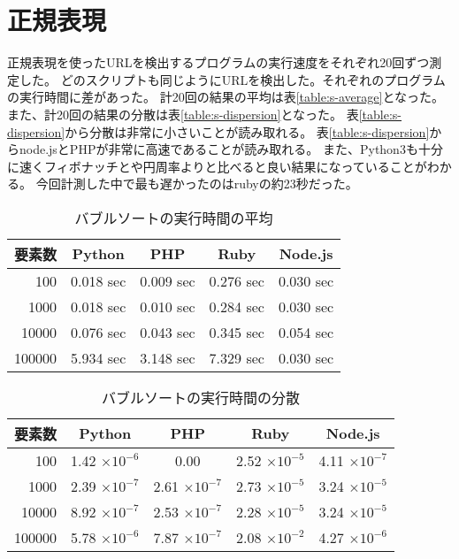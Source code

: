 \section{正規表現}
正規表現を使ったURLを検出するプログラムの実行速度をそれぞれ20回ずつ測定した。
どのスクリプトも同じようにURLを検出した。それぞれのプログラムの実行時間に差があった。
計20回の結果の平均は表\ref{table:s-average}となった。
また、計20回の結果の分散は表\ref{table:s-dispersion}となった。
表\ref{table:s-dispersion}から分散は非常に小さいことが読み取れる。
表\ref{table:s-dispersion}からnode.jsとPHPが非常に高速であることが読み取れる。
また、Python3も十分に速くフィボナッチとや円周率よりと比べると良い結果になっていることがわかる。
今回計測した中で最も遅かったのはrubyの約23秒だった。

\begin{table}[tb]
\centering
\begin{tabular}{|r||c|c|c|c|}
\hline
要素数 & Python & PHP &Ruby	&Node.js \\ \hline \hline
100	    & 0.018 sec & 0.009 sec	& 0.276	sec & 0.030 sec \\ \hline
1000	& 0.018 sec	& 0.010 sec	& 0.284	sec & 0.030 sec \\ \hline
10000	& 0.076 sec	& 0.043 sec	& 0.345	sec & 0.054 sec \\ \hline
100000	& 5.934 sec	& 3.148	sec & 7.329	sec & 0.030 sec \\ \hline
\end{tabular}
\caption{バブルソートの実行時間の平均}
\label{table:b-average}
\end{table}

\begin{table}[tb]
\centering
\begin{tabular}{|r||c|c|c|c|}
\hline
要素数 & Python & PHP &Ruby	&Node.js \\ \hline \hline
100     & 1.42 $\times 10^{-6}$ & 0.00                  & 2.52 $\times 10^{-5}$	& 4.11 $\times 10^{-7}$ \\ \hline
1000	& 2.39 $\times 10^{-7}$ & 2.61 $\times 10^{-7}$ & 2.73 $\times 10^{-5}$	& 3.24 $\times 10^{-5}$ \\ \hline
10000	& 8.92 $\times 10^{-7}$ & 2.53 $\times 10^{-7}$ & 2.28 $\times 10^{-5}$ & 3.24 $\times 10^{-5}$ \\ \hline
100000	& 5.78 $\times 10^{-6}$ & 7.87 $\times 10^{-7}$ & 2.08 $\times 10^{-2}$ & 4.27 $\times 10^{-6}$ \\ \hline
\end{tabular}
\caption{バブルソートの実行時間の分散}
\label{table:b-dispersion}
\end{table}

